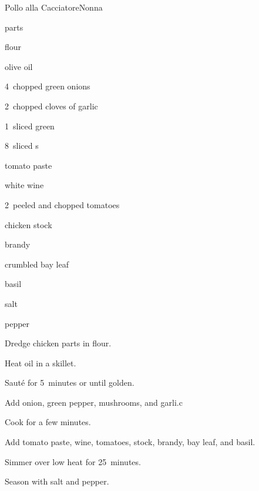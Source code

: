 \begin{recipe}{Pollo alla Cacciatore}{Nonna}{}

\begin{ingredients}
\item {}  parts
\item \C{\half} flour
\item {} olive oil
\item 4~chopped green onions
\item 2~chopped cloves of garlic
\item 1~sliced green 
\item 8~sliced s
\item {} tomato paste
\item \C{\half} white wine
\item 2~peeled and chopped tomatoes
\item \C{\threequarter} chicken stock
\item \C{\quarter} brandy
\item crumbled bay leaf
\item basil
\item salt
\item pepper
\end{ingredients}

\begin{directions}
\item Dredge chicken parts in flour.
\item Heat oil in a skillet.
\item Saut\'e for 5~minutes or until golden.
\item Add onion, green pepper, mushrooms, and garli.c
\item Cook for a few minutes.
\item Add tomato paste, wine, tomatoes, stock, brandy, bay leaf, and basil.
\item Simmer over low heat for 25~minutes.
\item Season with salt and pepper.
\end{directions}

\end{recipe}
